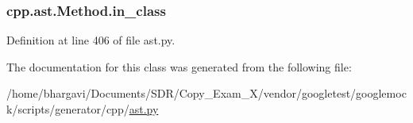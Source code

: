 \subsubsection[{\texorpdfstring{in\+\_\+class}{in_class}}]{\setlength{\rightskip}{0pt plus 5cm}cpp.\+ast.\+Method.\+in\+\_\+class}\hypertarget{classcpp_1_1ast_1_1_method_aa67244c3673afed43398b5d3e3fa6c1c}{}\label{classcpp_1_1ast_1_1_method_aa67244c3673afed43398b5d3e3fa6c1c}


Definition at line 406 of file ast.\+py.



The documentation for this class was generated from the following file\+:\begin{DoxyCompactItemize}
\item 
/home/bhargavi/\+Documents/\+S\+D\+R/\+Copy\+\_\+\+Exam\+\_\+X/vendor/googletest/googlemock/scripts/generator/cpp/\hyperlink{ast_8py}{ast.\+py}\end{DoxyCompactItemize}
